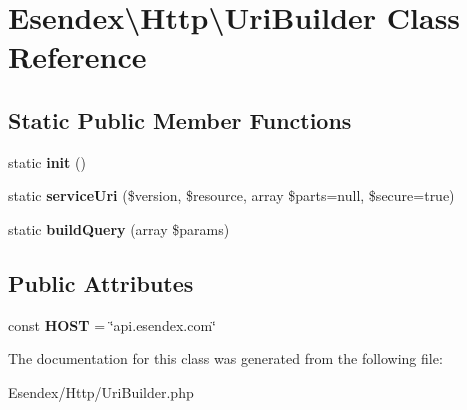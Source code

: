\section{Esendex\textbackslash{}Http\textbackslash{}Uri\-Builder Class Reference}
\label{class_esendex_1_1_http_1_1_uri_builder}
\subsection*{Static Public Member Functions}
\begin{DoxyCompactItemize}
\item 
static {\bfseries init} ()\label{class_esendex_1_1_http_1_1_uri_builder_afd5606c92b01a6af4d01efcc97f12704}

\item 
static {\bfseries service\-Uri} (\$version, \$resource, array \$parts=null, \$secure=true)\label{class_esendex_1_1_http_1_1_uri_builder_aaff399e5eb7d6b38ca8c0033d1035ba1}

\item 
static {\bfseries build\-Query} (array \$params)\label{class_esendex_1_1_http_1_1_uri_builder_a61937d1f9ef38a24e94b9030a5eebf79}

\end{DoxyCompactItemize}
\subsection*{Public Attributes}
\begin{DoxyCompactItemize}
\item 
const {\bfseries H\-O\-S\-T} = \char`\"{}api.\-esendex.\-com\char`\"{}\label{class_esendex_1_1_http_1_1_uri_builder_afca6ef6c2080862567a02732bb0b46cd}

\end{DoxyCompactItemize}


The documentation for this class was generated from the following file\-:\begin{DoxyCompactItemize}
\item 
Esendex/\-Http/Uri\-Builder.\-php\end{DoxyCompactItemize}
